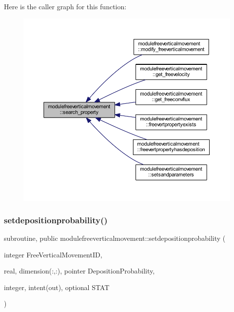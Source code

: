 Here is the caller graph for this function\+:\nopagebreak
\begin{figure}[H]
\begin{center}
\leavevmode
\includegraphics[width=350pt]{namespacemodulefreeverticalmovement_a7533a239e57263d95d53d832615113be_icgraph}
\end{center}
\end{figure}
\mbox{\label{namespacemodulefreeverticalmovement_af516e84df0a0267e1305aeeba0e3d131}} 
\subsubsection{\texorpdfstring{setdepositionprobability()}{setdepositionprobability()}}
{\footnotesize\ttfamily subroutine, public modulefreeverticalmovement\+::setdepositionprobability (\begin{DoxyParamCaption}\item[{integer}]{Free\+Vertical\+Movement\+ID,  }\item[{real, dimension(\+:,\+:), pointer}]{Deposition\+Probability,  }\item[{integer, intent(out), optional}]{S\+T\+AT }\end{DoxyParamCaption})}

